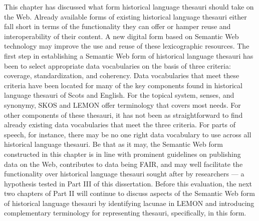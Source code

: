 This chapter has discussed what form historical language thesauri should take on the Web. Already available forms of existing historical language thesauri either fall short in terms of the functionality they can offer or hamper reuse and interoperability of their content. A new digital form based on Semantic Web technology may improve the use and reuse of these lexicographic resources. The first step in establishing a Semantic Web form of historical language thesauri has been to select appropriate data vocabularies on the basis of three criteria: coverage, standardization, and coherency. 
%
Data vocabularies that meet these criteria have been located for many of the key components found in historical language thesauri of Scots and English. For the topical system, senses, and synonymy, SKOS and LEMON offer terminology that covers most needs. For other components of these thesauri, it has not been as straightforward to find already existing data vocabularies that meet the three criteria. For parts of speech, for instance, there may be no one right data vocabulary to use across all historical language thesauri. Be that as it may, the Semantic Web form constructed in this chapter is in line with prominent guidelines on publishing data on the Web, contributes to data being FAIR, and may well facilitate the functionality over historical language thesauri sought after by researchers --- a hypothesis tested in Part III of this dissertation. Before this evaluation, the next two chapters of Part II will continue to discuss aspects of the Semantic Web form of historical language thesauri by identifying lacunae in LEMON and introducing complementary terminology for representing thesauri, specifically, in this form.



